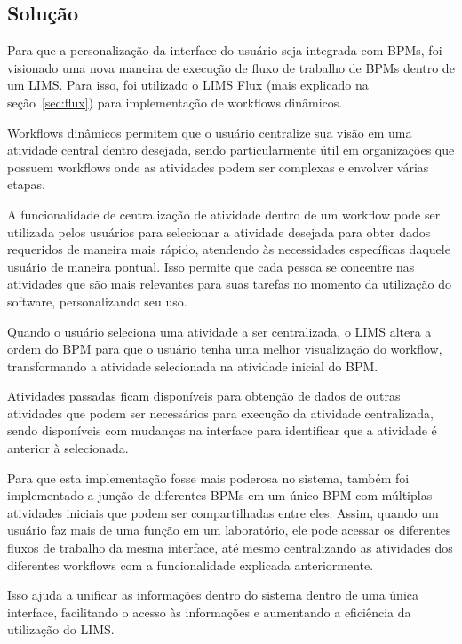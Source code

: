 \subsection{Solução}


Para que a personalização da interface do usuário seja integrada com BPMs, foi visionado uma nova maneira de execução de fluxo de trabalho de BPMs dentro de um LIMS. Para isso, foi utilizado o LIMS Flux (mais explicado na seção~\ref{sec:flux}) para implementação de workflows dinâmicos.

Workflows dinâmicos permitem que o usuário centralize sua visão em uma atividade central dentro desejada, sendo particularmente útil em organizações que possuem workflows onde as atividades podem ser complexas e envolver várias etapas.


A funcionalidade de centralização de atividade dentro de um workflow pode ser utilizada pelos usuários para selecionar a atividade desejada para obter dados requeridos de maneira mais rápido, atendendo às necessidades específicas daquele usuário de maneira pontual. Isso permite que cada pessoa se concentre nas atividades que são mais relevantes para suas tarefas no momento da utilização do software, personalizando seu uso.

Quando o usuário seleciona uma atividade a ser centralizada, o LIMS altera a ordem do BPM para que o usuário tenha uma melhor visualização do workflow, transformando a atividade selecionada na atividade inicial do BPM.

Atividades passadas ficam disponíveis para obtenção de dados de outras atividades que podem ser necessários para execução da atividade centralizada, sendo disponíveis com mudanças na interface para identificar que a atividade é anterior à selecionada.


Para que esta implementação fosse mais poderosa no sistema, também foi implementado a junção de diferentes BPMs em um único BPM com múltiplas atividades iniciais que podem ser compartilhadas entre eles. Assim, quando um usuário faz mais de uma função em um laboratório, ele pode acessar os diferentes fluxos de trabalho da mesma interface, até mesmo centralizando as atividades dos diferentes workflows com a funcionalidade explicada anteriormente.

Isso ajuda a unificar as informações dentro do sistema dentro de uma única interface, facilitando o acesso às informações e aumentando a eficiência da utilização do LIMS. 



